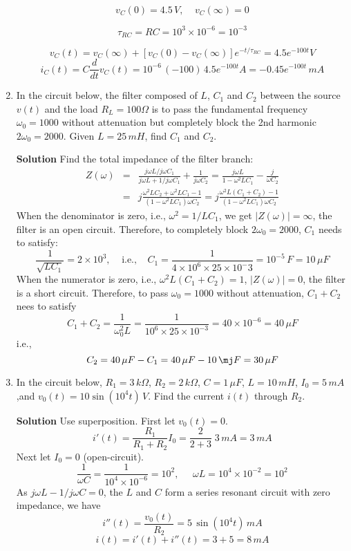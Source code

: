 \begin{enumerate}
  \[
  v_C(0)=4.5\,V,\;\;\;\;v_C(\infty)=0
  \]

  \[
  \tau_{RC}=RC=10^3\times 10^{-6}=10^{-3}
  \]
  
  \[
  v_C(t)=v_C(\infty)+[v_C(0)-v_C(\infty)]e^{-t/\tau_{RC}}=4.5 e^{-100 t}V
  \]
  \[
  i_C(t)=C\frac{d}{dt}v_C(t)=10^{-6}\,(-100)\, 4.5e^{-100t} A=-0.45 e^{-100t}\,mA
  \]

\item In the circuit below, the filter composed of $L$, $C_1$ and $C_2$
  between the source $v(t)$ and the load $R_L=100\Omega$ is to pass the 
  fundamental frequency $\omega_0=1000$ without attenuation but completely 
  block the 2nd harmonic $2\omega_0=2000$. Given $L=25\,mH$, find $C_1$
  and $C_2$.


  {\bf Solution} Find the total impedance of the filter branch:
  \begin{eqnarray}
    Z(\omega)&=&\frac{j\omega L/j\omega C_1}{j\omega L+1/j\omega C_1}+\frac{1}{j\omega C_2}
    =\frac{j\omega L}{1-\omega^2LC_1}-\frac{j}{\omega C_2}
    \nonumber\\
    &=&j\frac{\omega^2LC_2+\omega^2LC_1-1}{(1-\omega^2LC_1)\omega C_2}
    =j\frac{\omega^2L(C_1+C_2)-1}{(1-\omega^2LC_1)\omega C_2}
    \nonumber
  \end{eqnarray}
  When the denominator is zero, i.e., $\omega^2=1/LC_1$, we get 
  $|Z(\omega)|=\infty$, the filter is an open circuit. Therefore, to 
  completely block $2\omega_0=2000$, $C_1$ needs to satisfy:
  \[
  \frac{1}{\sqrt{LC_1}}=2\times 10^3,\;\;\;\;\mbox{i.e.,}\;\;\;\;
  C_1=\frac{1}{4\times 10^6 \times 25\times 10^-3}=10^{-5}\,F=10\,\mu F
  \]
  When the numerator is zero, i.e., $\omega^2L(C_1+C_2)=1$,  $|Z(\omega)|=0$,
  the filter is a short circuit. Therefore, to pass $\omega_0=1000$ without
  attenuation, $C_1+C_2$ nees to satisfy
  \[
  C_1+C_2=\frac{1}{\omega_0^2L}=\frac{1}{10^6\times 25\times 10^{-3}}=40\times 10^{-6}=40\,\mu F
  \]
  i.e.,
  \[
  C_2=40\,\mu F-C_1=40\,\mu F-10\,\mj F=30\,\mu F
  \]

\item In the circuit below, $R_1=3\,k\Omega$, $R_2=2\,k\Omega$, $C=1\,\mu F$, 
  $L=10\,mH$, $I_0=5\,mA$,and $v_0(t)=10\sin(10^4t)\,V$. Find the 
  current $i(t)$ through $R_2$.

    
  {\bf Solution} Use superposition. First let $v_0(t)=0$. 
  \[
  i'(t)=\frac{R_1}{R_1+R_2}I_0=\frac{2}{2+3}\;3\,mA=3\,mA
  \]
  Next let $I_0=0$ (open-circuit). 
  \[
  \frac{1}{\omega C}=\frac{1}{10^4\times 10^{-6}}=10^2,
  \;\;\;\;\;
  \omega L=10^4\times 10^{-2}=10^2
  \]
  As $j\omega L-1/j\omega C=0$, the $L$ and $C$ form a series resonant
  circuit with zero impedance, we have
  \[
  i''(t)=\frac{v_0(t)}{R_2}=5\,\sin(10^4t)\,mA
  \]
  \[
  i(t)=i'(t)+i''(t)=3+5=8\,mA
  \]


\end{enumerate}
